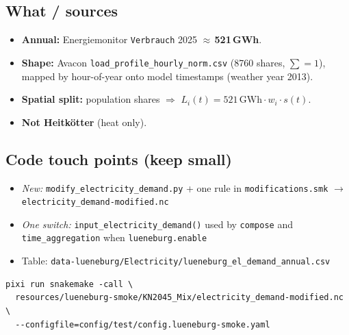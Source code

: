 \documentclass[11pt,a4paper]{article}
\begin{document}
\noindent{}

\vspace{0.8em}

\subsection{What / sources}
\begin{itemize}[leftmargin=*]
  \item \textbf{Annual:} Energiemonitor \texttt{Verbrauch} 2025 $\approx$\,\textbf{521\,GWh}.
  \item \textbf{Shape:} Avacon \texttt{load\_profile\_hourly\_norm.csv} (8760 shares, $\sum=1$),
        mapped by hour-of-year onto model timestamps (weather year 2013).
  \item \textbf{Spatial split:} population shares
        $\Rightarrow$ $L_i(t)=521\,\mathrm{GWh}\cdot w_i\cdot s(t)$.
  \item \textbf{Not Heitkötter} (heat only).
\end{itemize}

\subsection{Code touch points (keep small)}
\begin{itemize}[leftmargin=*]
  \item \emph{New:} \texttt{modify\_electricity\_demand.py} + one rule in
        \texttt{modifications.smk} $\to$ \texttt{electricity\_demand-modified.nc}
  \item \emph{One switch:} \texttt{input\_electricity\_demand()} used by
        \texttt{compose} and \texttt{time\_aggregation} when \texttt{lueneburg.enable}
  \item Table: \texttt{data-lueneburg/Electricity/lueneburg\_el\_demand\_annual.csv}
\end{itemize}

\begin{lstlisting}
pixi run snakemake -call \
  resources/lueneburg-smoke/KN2045_Mix/electricity_demand-modified.nc \
  --configfile=config/test/config.lueneburg-smoke.yaml
\end{lstlisting}
\end{document}
